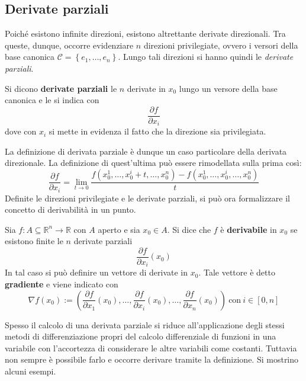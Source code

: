 \subsection{Derivate parziali}
Poiché esistono infinite direzioni, esistono altrettante derivate direzionali. Tra queste, dunque, occorre evidenziare $n$ direzioni privilegiate, ovvero i versori della base canonica $\mathcal{C}=\left\{e_1,\dots, e_n\right\}$. Lungo tali direzioni si hanno quindi le \textit{derivate parziali}.
\begin{definition} \label{Def: Derivate parziali}
    Si dicono \textbf{derivate parziali} le $n$ derivate in $x_0$ lungo un versore della base canonica e le si indica con
    \begin{equation*}
        \frac{\partial{f}}{\partial{x_i}}
    \end{equation*}
    dove con $x_i$ si mette in evidenza il fatto che la direzione sia privilegiata.
\end{definition}
La definizione di derivata parziale è dunque un caso particolare della derivata direzionale. La definizione di quest'ultima può essere rimodellata sulla prima così:
\begin{equation*}
    \frac{\partial{f}}{\partial{x_i}}=\lim_{t \to 0}{\frac{f(x_0^1, \dots, x_0^i+t, \dots, x_0^n)-f(x_0^1, \dots, x_0^i, \dots, x_0^n)}{t}}
\end{equation*}
Definite le direzioni privilegiate e le derivate parziali, si può ora formalizzare il concetto di derivabilità in un punto.
\begin{definition} \label{Def: Derivabilità}
    Sia $f:A \subseteq \mathbb{R}^n \to \mathbb{R}$ con $A$ aperto e sia $x_0 \in A$. Si dice che $f$ è \textbf{derivabile} in $x_0$ se esistono finite le $n$ derivate parziali
    \begin{equation*}
        \frac{\partial{f}}{\partial{x_i}}(x_0)
    \end{equation*}
In tal caso si può definire un vettore di derivate in $x_0$. Tale vettore è detto \textbf{gradiente} e viene indicato con
\begin{equation*}
    \nabla f(x_0) := \left(\frac{\partial{f}}{\partial{x_1}}(x_0), \dots, \frac{\partial{f}}{\partial{x_i}}(x_0), \dots, \frac{\partial{f}}{\partial{x_n}}(x_0)\right)\ \text{con}\ i \in [0,n]
\end{equation*}
\end{definition}
Spesso il calcolo di una derivata parziale si riduce all'applicazione degli stessi metodi di differenziazione propri del calcolo differenziale di funzioni in una variabile con l'accortezza di considerare le altre variabili come costanti. Tuttavia non sempre è possibile farlo e occorre derivare tramite la definizione. Si mostrino alcuni esempi.
